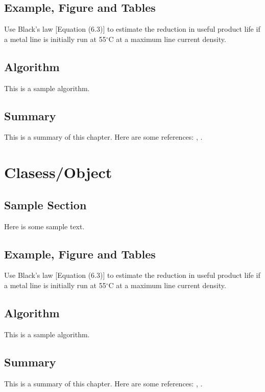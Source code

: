 \documentclass{wileySix}
\begin{document}
\section{Example, Figure and Tables}
\vskip6pt
\begin{example}
	Use Black's law [Equation (6.3)] to estimate the reduction in useful product
	life if a metal line is initially run at 55$^\circ$C at a maximum line
	current density.
\end{example}

\section{Algorithm}
This is a sample algorithm.

\section{Summary}
This is a summary of this chapter.
Here are some references: \cite{xkilby}, \cite{xberen}.

\chapter{Clasess/Object}

\section{Sample Section}
Here is some sample text.

\section{Example, Figure and Tables}
\vskip6pt
\begin{example}
	Use Black's law [Equation (6.3)] to estimate the reduction in useful product
	life if a metal line is initially run at 55$^\circ$C at a maximum line
	current density.
\end{example}

\section{Algorithm}
This is a sample algorithm.

\section{Summary}
This is a summary of this chapter.
Here are some references: \cite{xkilby}, \cite{xberen}.
\end{document}
